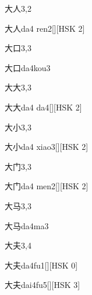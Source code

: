 \begin{entry}{大人}{3,2}
  \begin{phonetics}{大人}{da4 ren2}[][HSK 2]
  \end{phonetics}
\end{entry}

\begin{entry}{大口}{3,3}
  \begin{phonetics}{大口}{da4kou3}
  \end{phonetics}
\end{entry}

\begin{entry}{大大}{3,3}
  \begin{phonetics}{大大}{da4 da4}[][HSK 2]
  \end{phonetics}
\end{entry}

\begin{entry}{大小}{3,3}
  \begin{phonetics}{大小}{da4 xiao3}[][HSK 2]
  \end{phonetics}
\end{entry}

\begin{entry}{大门}{3,3}
  \begin{phonetics}{大门}{da4 men2}[][HSK 2]
  \end{phonetics}
\end{entry}

\begin{entry}{大马}{3,3}
  \begin{phonetics}{大马}{da4ma3}
  \end{phonetics}
\end{entry}

\begin{entry}{大夫}{3,4}
  \begin{phonetics}{大夫}{da4fu1}[][HSK 0]
  \end{phonetics}
  \begin{phonetics}{大夫}{dai4fu5}[][HSK 3]
  \end{phonetics}
\end{entry}

